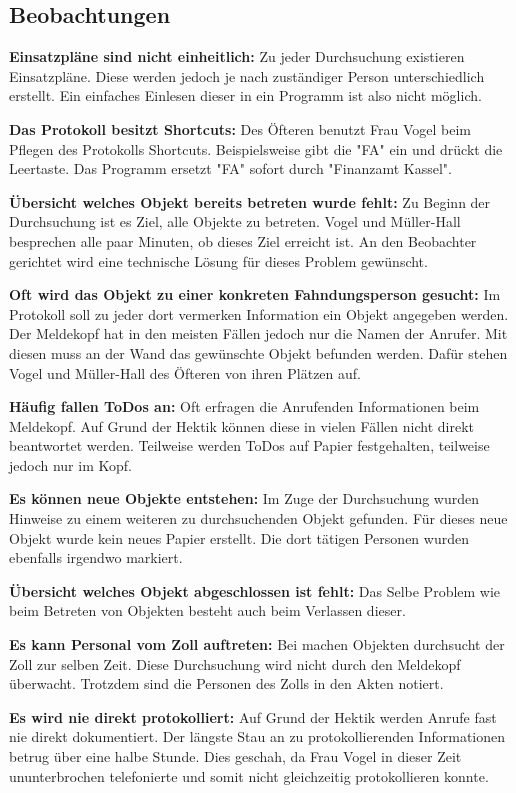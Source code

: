 \subsection{Beobachtungen}

\textbf{Einsatzpläne sind nicht einheitlich:} Zu jeder Durchsuchung existieren Einsatzpläne.
Diese werden jedoch je nach zuständiger Person unterschiedlich erstellt.
Ein einfaches Einlesen dieser in ein Programm ist also nicht möglich.

\textbf{Das Protokoll besitzt Shortcuts:} Des Öfteren benutzt Frau Vogel beim Pflegen des Protokolls Shortcuts.
Beispielsweise gibt die "FA" ein und drückt die Leertaste.
Das Programm ersetzt "FA" sofort durch "Finanzamt Kassel".

\textbf{Übersicht welches Objekt bereits betreten wurde fehlt:} Zu Beginn der Durchsuchung ist es Ziel, alle Objekte zu betreten.
Vogel und  Müller-Hall besprechen alle paar Minuten, ob dieses Ziel erreicht ist.
An den Beobachter gerichtet wird eine technische Lösung für dieses Problem gewünscht.

\textbf{Oft wird das Objekt zu einer konkreten Fahndungsperson gesucht:} Im Protokoll soll zu jeder dort vermerken Information ein Objekt angegeben werden.
Der Meldekopf hat in den meisten Fällen jedoch nur die Namen der Anrufer. 
Mit diesen muss an der Wand das gewünschte Objekt befunden werden.
Dafür stehen Vogel und Müller-Hall des Öfteren von ihren Plätzen auf.

\textbf{Häufig fallen ToDos an:} Oft erfragen die Anrufenden Informationen beim Meldekopf.
Auf Grund der Hektik können diese in vielen Fällen nicht direkt beantwortet werden.
Teilweise werden ToDos auf Papier festgehalten, teilweise jedoch nur im Kopf.

\textbf{Es können neue Objekte entstehen:} Im Zuge der Durchsuchung wurden Hinweise zu einem weiteren zu durchsuchenden Objekt gefunden.
Für dieses neue Objekt wurde kein neues Papier erstellt.
Die dort tätigen Personen wurden ebenfalls irgendwo markiert.

\textbf{Übersicht welches Objekt abgeschlossen ist fehlt:} Das Selbe Problem wie beim Betreten von Objekten besteht auch beim Verlassen dieser.

\textbf{Es kann Personal vom Zoll auftreten:} Bei machen Objekten durchsucht der Zoll zur selben Zeit.
Diese Durchsuchung wird nicht durch den Meldekopf überwacht.
Trotzdem sind die Personen des Zolls in den Akten notiert.

\textbf{Es wird nie direkt protokolliert:} Auf Grund der Hektik werden Anrufe fast nie direkt dokumentiert.
Der längste Stau an zu protokollierenden Informationen betrug über eine halbe Stunde.
Dies geschah, da Frau Vogel in dieser Zeit ununterbrochen telefonierte und somit nicht gleichzeitig protokollieren konnte.

